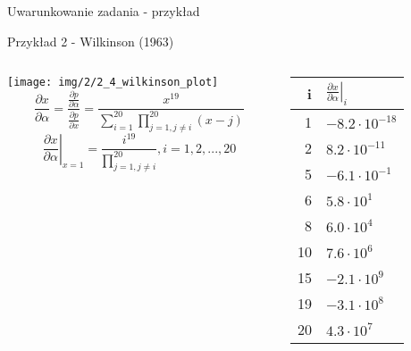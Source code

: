 \begin{frame}{Uwarunkowanie zadania - przykład}
	\begin{exampleblock}{Przykład 2 - Wilkinson (1963)}
    \begin{columns}
    	\begin{column}{.6\linewidth}
          \centering \texttt{[image: img/2/2\_4\_wilkinson\_plot]}
          \[
              \frac{
                  \partial x
              }{
                  \partial \alpha
              } = \frac{
                  \frac{\partial p}{\partial \alpha}
              }{
                  \frac{\partial p}{\partial x}
              } = \frac{
                  x^{19}
              }{
                  \sum_{i=1}^{20} \prod_{j=1, j \neq i}^{20} (x-j)
              }
          \]
          \[ 
              \left.
                  \frac{\partial x}{\partial \alpha}
              \right|_{x=1} = \frac{
                  i^{19}
              }{
                  \prod_{j=1, j \neq i}^{20}
              }, i = 1, 2, ..., 20
          \]
    	\end{column}
        \begin{column}{.3\linewidth}
          \begin{tabular}{r | l}
              i & $\left.
                  \frac{\partial x}{\partial \alpha}
              \right|_i$ \\
              \hline
               1 & $-8.2 \cdot 10^{-18}$ \\
               2 & $ 8.2 \cdot 10^{-11}$ \\
               5 & $-6.1 \cdot 10^{-1}$  \\
               6 & $ 5.8 \cdot 10^{1}$   \\
               8 & $ 6.0 \cdot 10^{4}$   \\
              10 & $ 7.6 \cdot 10^{6}$   \\
              15 & $-2.1 \cdot 10^{9}$   \\
              19 & $-3.1 \cdot 10^{8}$   \\
              20 & $ 4.3 \cdot 10^{7}$   \\
          \end{tabular}
        \end{column}
    \end{columns}
    \end{exampleblock}
\end{frame}
